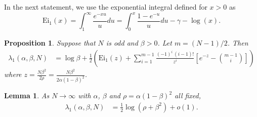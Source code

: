 \documentclass[12pt]{article}
\newtheorem{lemma}{Lemma}
\newtheorem{proposition}{Proposition}
\newcommand{\1}{\mathbf{1}}
\begin{document}
In the next statement, we use the exponential integral defined for $x>0$ as
$$
\mathrm{Ei}_1(x)=\int_1^\infty \frac{e^{-xu}}{u}du=\int_0^x \frac{1-e^{-u}}{u}du-\gamma- \log(x).
$$
\begin{proposition}\label{prop:Nodd}
Suppose that $N$ is odd and $\beta>0$. Let $m=(N-1)/2$. Then
 \begin{align}\label{E: analytic expression for lambda1}
\lambda_1(\alpha,\beta,N)&=\log\beta
+\frac12\left( \mathrm{Ei}_1 \left(z\right)
+ \sum_{i=1}^{m-1} \frac{(-1)^i\, (i-1)!}{z^i}
\left[e^{-z}-\binom{m-1}{i}\right]\right)
\end{align}
where $z=\frac{N\beta^2}{2\rho}=\frac{N\beta^2}{2\alpha (1-\beta)^2}$.
\end{proposition}
\begin{lemma}\label{lem:lambda1asympt}
As $N\to\infty$ with $\alpha$, $\beta$ and $\rho  = \alpha(1-\beta)^2$ all fixed,
\begin{align}\label{lam1asy}    
\lambda_1(\alpha,\beta,N)
&=\frac12%
\log \left(\rho+\beta^2\right) 
+o(1).
\end{align}
\end{lemma}
\end{document}
